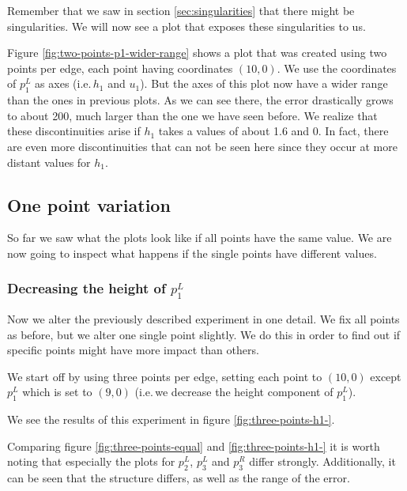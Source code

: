 \documentclass[a4paper, twoside]{article}
\begin{document}
Remember that we saw in section \ref{sec:singularities} that there might be singularities. We will now see a plot that exposes these singularities to us.



Figure \ref{fig:two-points-p1-wider-range} shows a plot that was created using two points per edge, each point having coordinates $(10,0)$. We use the coordinates of $p_1^L$ as axes (i.e.\,$h_1$ and $u_1$). But the axes of this plot now have a wider range than the ones in previous plots. As we can see there, the error drastically grows to about 200, much larger than the one we have seen before. We realize that these discontinuities arise if $h_1$ takes a values of about 1.6 and 0. In fact, there are even more discontinuities that can not be seen here since they occur at more distant values for $h_1$.

\subsection{One point variation}
\label{sec:one-point-variation}

So far we saw what the plots look like if all points have the same value. We are now going to inspect what happens if the single points have different values.

\subsubsection{\texorpdfstring{Decreasing the height of $p_1^L$}{Decreasing the height of p1L}}
\label{sec:decreasing-height-p1}

Now we alter the previously described experiment in one detail. We fix all points as before, but we alter one single point slightly. We do this in order to find out if specific points might have more impact than others.

We start off by using three points per edge, setting each point to $\left(10, 0\right)$ except $p_1^L$ which is set to $\left(9, 0\right)$ (i.e.\,we decrease the height component of $p_1^L$).



We see the results of this experiment in figure \ref{fig:three-points-h1-}.

Comparing figure \ref{fig:three-points-equal} and \ref{fig:three-points-h1-} it is worth noting that especially the plots for $p_2^L$, $p_3^L$ and $p_3^R$ differ strongly. Additionally, it can be seen that the structure differs, as well as the range of the error.
\end{document}
